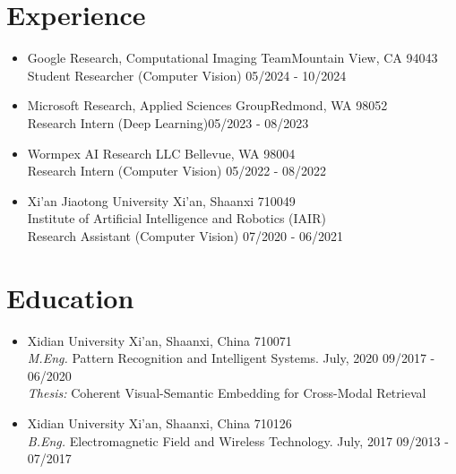 \documentclass[10pt,margin,line,pifont,palatino,courier]{res}
\begin{document}
\begin{resume}
\section{\sc Experience}

\begin{itemize}[leftmargin=*]
    \item Google Research, Computational Imaging Team\hfill Mountain View, CA 94043\\
        Student Researcher (Computer Vision) \hfill 05/2024 - 10/2024
	\item Microsoft Research, Applied Sciences Group\hfill Redmond, WA 98052\\
        Research Intern (Deep Learning)\hfill 05/2023 - 08/2023
    \item Wormpex AI Research LLC \hfill Bellevue, WA 98004\\
        Research Intern (Computer Vision) \hfill 05/2022 - 08/2022
	\item Xi'an Jiaotong University \hfill Xi'an, Shaanxi 710049\\
        Institute of Artificial Intelligence and Robotics (IAIR) \\
        Research Assistant (Computer Vision) \hfill 07/2020 - 06/2021 
\end{itemize}

\section{\sc Education}

\begin{itemize}[leftmargin=*]
\item Xidian University \hfill Xi'an, Shaanxi, China 710071\\
	\textit{M.Eng.} Pattern Recognition and Intelligent Systems. July, 2020 \hfill 09/2017 - 06/2020\\
	\textit{Thesis:} Coherent Visual-Semantic Embedding for Cross-Modal Retrieval
\item Xidian University \hfill Xi'an, Shaanxi, China 710126\\
	\textit{B.Eng.} Electromagnetic Field and Wireless Technology. July, 2017 \hfill 09/2013 - 07/2017
\end{itemize}


\end{resume}
\end{document}
